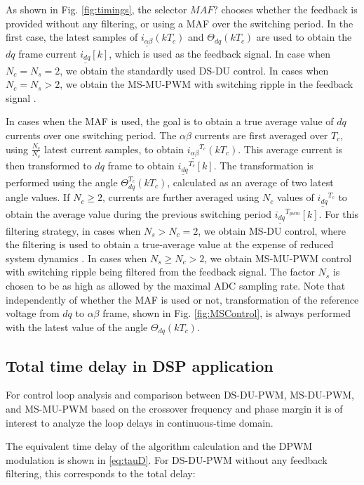 \documentclass[conference]{IEEEtran}
\begin{document}
As shown in Fig. \ref{fig:timings}, the selector $MAF?$ chooses whether the feedback is provided without any filtering, or using a MAF over the switching period. In the first case, the latest samples of $\underline{i_{\alpha \beta}}(kT_c)$ and $\Theta_{dq}(kT_c)$ are used to obtain the $dq$ frame current $\underline{i_{dq}}[k]$, which is used as the feedback signal. In case when $N_c = N_s = 2$, we obtain the standardly used DS-DU control. In cases when $N_c = N_s > 2$, we obtain the MS-MU-PWM with switching ripple in the feedback signal \cite{Petric2020}.

In cases when the MAF is used, the goal is to obtain a true average value of $dq$ currents over one switching period. The $\alpha \beta$ currents are first averaged over $T_c$, using $\frac{N_s}{N_c}$ latest current samples, to obtain $\underline{i_{\alpha \beta}}^{T_c} (kT_c)$. This average current is then transformed to $dq$ frame to obtain $\underline{i_{dq}}^{T_c} [k]$. The transformation is performed using the angle $\Theta_{dq}^{T_c}(kT_c)$, calculated as an average of two latest angle values. If $N_c\geq 2$, currents are further averaged using $N_c$ values of $\underline{i_{dq}}^{T_c}$ to obtain the average value during the previous switching period $\underline{i_{dq}}^{T_{pwm}}[k]$.
For this filtering strategy, in cases when $N_s>N_c = 2$, we obtain MS-DU control, where the filtering is used to obtain a true-average value at the expense of reduced system dynamics \cite{vuksa2016}. In cases when $N_s \geq N_c > 2$, we obtain MS-MU-PWM control with switching ripple being filtered from the feedback signal. The factor $N_s$ is chosen to be as high as allowed by the maximal ADC sampling rate.
Note that independently of whether the MAF is used or not, transformation of the reference voltage from $dq$ to $\alpha \beta$ frame, shown in Fig. \ref{fig:MSControl}, is always performed with the latest value of the angle $\Theta_{dq}(kT_c)$.

\subsection{Total time delay in DSP application}

For control loop analysis and comparison between DS-DU-PWM, MS-DU-PWM, and MS-MU-PWM based on the crossover frequency and phase margin it is of interest to analyze the loop delays in continuous-time domain.

The equivalent time delay of the algorithm calculation and the DPWM modulation is shown in \eqref{eq:tauD}. For DS-DU-PWM without any feedback filtering, this corresponds to the total delay:
\end{document}

